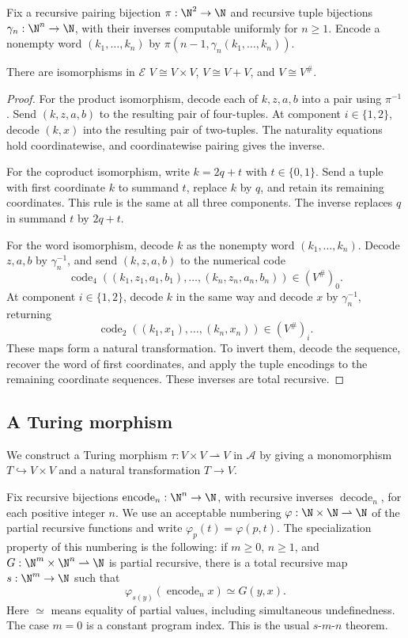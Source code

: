 Fix a recursive pairing bijection
$\pi:\N^2\to\N$ and recursive tuple bijections
$\gamma_n:\N^n\to\N$, with their inverses computable uniformly
for $n\ge1$. Encode a nonempty word $(k_1,\ldots,k_n)$ by
$\pi(n-1,\gamma_n(k_1,\ldots,k_n))$.

\begin{lemma}\label{lem:fork-frames}
There are isomorphisms in $\mathcal E$
$V\cong V\times V$, $V\cong V+V$, and $V\cong V^\#$.
\end{lemma}
\begin{proof}
For the product isomorphism, decode each of $k,z,a,b$ into a
pair using $\pi^{-1}$. Send $(k,z,a,b)$ to the resulting pair
of four-tuples. At component $i\in\{1,2\}$, decode $(k,x)$ into
the resulting pair of two-tuples. The naturality equations hold
coordinatewise, and coordinatewise pairing gives the inverse.

For the coproduct isomorphism, write $k=2q+t$ with
$t\in\{0,1\}$. Send a tuple with first coordinate $k$ to
summand $t$, replace $k$ by $q$, and retain its remaining
coordinates. This rule is the same at all three components.
The inverse replaces $q$ in summand $t$ by $2q+t$.

For the word isomorphism, decode $k$ as the nonempty word
$(k_1,\ldots,k_n)$. Decode $z,a,b$ by $\gamma_n^{-1}$,
and send $(k,z,a,b)$ to the numerical code
\[
 \operatorname{code}_4
 ((k_1,z_1,a_1,b_1),\ldots,(k_n,z_n,a_n,b_n))
 \in(V^\#)_0.
\]
At component $i\in\{1,2\}$, decode $k$ in the same way and
decode $x$ by $\gamma_n^{-1}$, returning
\[
 \operatorname{code}_2((k_1,x_1),\ldots,(k_n,x_n))\in(V^\#)_i.
\]
These maps form a natural transformation. To invert them, decode
the sequence, recover the word of first coordinates, and apply
the tuple encodings to the remaining coordinate sequences.
These inverses are total recursive.
\end{proof}

\subsection{A Turing morphism}\label{app:fork-turing}

We construct a Turing morphism $\tau:V\times V\rightharpoonup V$
in $\mathcal A$ by giving a monomorphism $T\hookrightarrow V\times V$
and a natural transformation $T\to V$.

Fix recursive bijections
$\operatorname{encode}_n:\N^n\to\N$, with recursive inverses
$\operatorname{decode}_n$, for each positive integer $n$.
We use an acceptable numbering
$\varphi:\N\times\N\rightharpoonup\N$ of the partial recursive
functions and write $\varphi_p(t)=\varphi(p,t)$.
The specialization property of this numbering is the following:
if $m\geq0$, $n\geq1$, and
$G:\N^m\times\N^n\rightharpoonup\N$ is partial recursive,
there is a total recursive map $s:\N^m\to\N$ such that
\[
 \varphi_{s(y)}(\operatorname{encode}_n x)\simeq G(y,x).
\]
Here $\simeq$ means equality of partial values,
including simultaneous undefinedness. The case $m=0$ is a
constant program index. This is the usual $s$-$m$-$n$ theorem.

